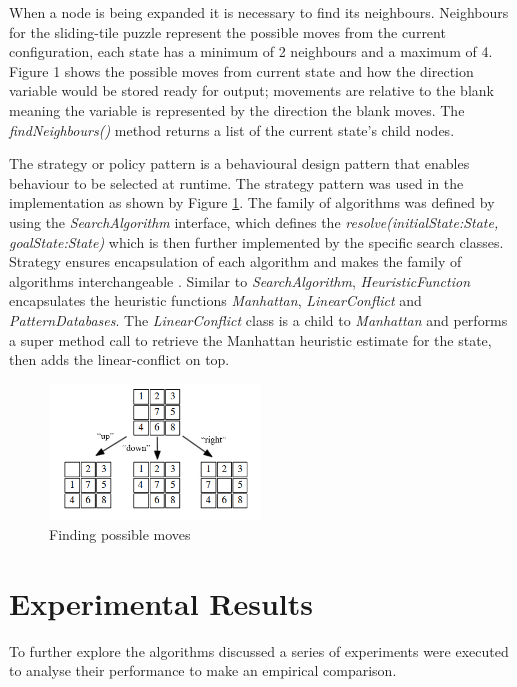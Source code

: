 \documentclass[final]{cmpreport}
\begin{document}
When a node is being expanded it is necessary to find its neighbours. Neighbours for the sliding-tile puzzle represent the possible moves from the current configuration, each state has a minimum of 2 neighbours and a maximum of 4. Figure 1 shows the possible moves from current state and how the direction variable would be stored ready for output; movements are relative to the blank meaning the variable is represented by the direction the blank moves. The \textit{findNeighbours()} method returns a list of the current state's child nodes. 

The strategy or policy pattern is a behavioural design pattern that enables behaviour to be selected at runtime. The strategy pattern was used in the implementation as shown by Figure \ref{figure:classDiagram}. The family of algorithms was defined by using the \textit{SearchAlgorithm} interface, which defines the \textit{resolve(initialState:State, goalState:State)} which is then further implemented by the specific search classes. Strategy ensures encapsulation of each algorithm and makes the family of algorithms interchangeable \cite{gamma1995design}. Similar to \textit{SearchAlgorithm}, \textit{HeuristicFunction} encapsulates the heuristic functions \textit{Manhattan}, \textit{LinearConflict} and \textit{PatternDatabases}. The \textit{LinearConflict} class is a child to \textit{Manhattan} and performs a super method call to retrieve the Manhattan heuristic estimate for the state, then adds the linear-conflict on top.

\begin{figure}[ht]
	\centering
	\includegraphics[width=0.5\textwidth]{moves}
	\captionsetup{justification=centering}
	\caption{Finding possible moves}
	\label{figure:classDiagram}
\end{figure}




\section{Experimental Results}\label{Experimental Results}
To further explore the algorithms discussed a series of experiments were executed to analyse their performance to make an empirical comparison. 
\end{document}
